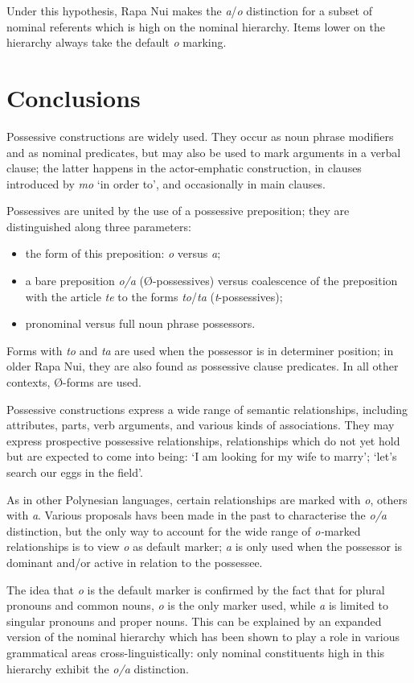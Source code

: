 Under this hypothesis, Rapa Nui makes the \textit{{\ꞌ}a}/\textit{o} distinction for a subset of nominal referents which is high on the nominal hierarchy. Items lower on the hierarchy always take the default \textit{o} marking.

\section{Conclusions}\label{sec:6.4}

Possessive constructions are widely used. They occur as noun phrase modifiers and as nominal predicates, but may also be used to mark arguments in a verbal clause; the latter happens in the actor-emphatic construction, in clauses introduced by \textit{mo} ‘in order to’, and occasionally in main clauses.

Possessives are united by the use of a possessive preposition; they are distinguished along three parameters:

\begin{itemize}
\item 
the form of this preposition: \textit{o} versus \textit{{\ꞌ}a}; 

\item 
a bare preposition \textit{o/{\ꞌ}a} (Ø-possessives) versus coalescence of the preposition with the article \textit{te} to the forms \textit{to}/\textit{ta} (\textit{t}{}-possessives); 

\item 
pronominal versus full noun phrase possessors.

\end{itemize}

Forms with \textit{to} and \textit{ta} are used when the possessor is in determiner position; in older Rapa Nui, they are also found as possessive clause predicates. In all other contexts, Ø-forms are used.

Possessive constructions express a wide range of semantic relationships, including attributes, parts, verb arguments, and various kinds of associations. They may express prospective possessive relationships, relationships which do not yet hold but are expected to come into being: ‘I am looking for my wife to marry’; ‘let’s search our eggs in the field’.

As in other Polynesian languages, certain relationships are marked with \textit{o}, others with \textit{{\ꞌ}a}. Various proposals havs been made in the past to characterise the \textit{o/a} distinction, but the only way to account for the wide range of \textit{o-}marked relationships is to view \textit{o} as default marker; \textit{{\ꞌ}a} is only used when the possessor is dominant and/or active in relation to the possessee.

The idea that \textit{o} is the default marker is confirmed by the fact that for plural pronouns and common nouns, \textit{o} is the only marker used, while \textit{{\ꞌ}}\textit{a} is limited to singular pronouns and proper nouns. This can be explained by an expanded version of the nominal hierarchy which has been shown to play a role in various grammatical areas cross-linguistically: only nominal constituents high in this hierarchy exhibit the \textit{o/a} distinction.
